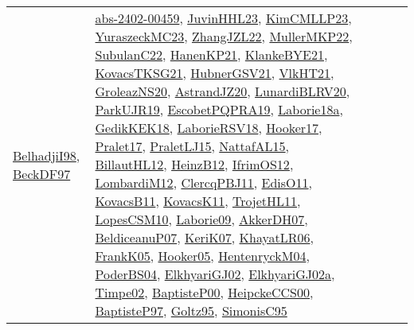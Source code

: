 {\begin{longtable}{lp{3cm}>{\raggedright}p{6cm}>{\raggedright}p{6cm}p{8cm}}
\href{articles/BelhadjiI98.pdf}{BelhadjiI98}\cite{BelhadjiI98}, \href{papers/BeckDF97.pdf}{BeckDF97}\cite{BeckDF97} & \href{articles/abs-2402-00459.pdf}{abs-2402-00459}\cite{abs-2402-00459}, \href{papers/JuvinHHL23.pdf}{JuvinHHL23}\cite{JuvinHHL23}, \href{papers/KimCMLLP23.pdf}{KimCMLLP23}\cite{KimCMLLP23}, \href{papers/YuraszeckMC23.pdf}{YuraszeckMC23}\cite{YuraszeckMC23}, \href{papers/ZhangJZL22.pdf}{ZhangJZL22}\cite{ZhangJZL22}, \href{articles/MullerMKP22.pdf}{MullerMKP22}\cite{MullerMKP22}, \href{articles/SubulanC22.pdf}{SubulanC22}\cite{SubulanC22}, \href{papers/HanenKP21.pdf}{HanenKP21}\cite{HanenKP21}, \href{papers/KlankeBYE21.pdf}{KlankeBYE21}\cite{KlankeBYE21}, \href{papers/KovacsTKSG21.pdf}{KovacsTKSG21}\cite{KovacsTKSG21}, \href{articles/HubnerGSV21.pdf}{HubnerGSV21}\cite{HubnerGSV21}, \href{articles/VlkHT21.pdf}{VlkHT21}\cite{VlkHT21}, \href{papers/GroleazNS20.pdf}{GroleazNS20}\cite{GroleazNS20}, \href{articles/AstrandJZ20.pdf}{AstrandJZ20}\cite{AstrandJZ20}, \href{articles/LunardiBLRV20.pdf}{LunardiBLRV20}\cite{LunardiBLRV20}, \href{papers/ParkUJR19.pdf}{ParkUJR19}\cite{ParkUJR19}, \href{articles/EscobetPQPRA19.pdf}{EscobetPQPRA19}\cite{EscobetPQPRA19}, \href{papers/Laborie18a.pdf}{Laborie18a}\cite{Laborie18a}, \href{articles/GedikKEK18.pdf}{GedikKEK18}\cite{GedikKEK18}, \href{articles/LaborieRSV18.pdf}{LaborieRSV18}\cite{LaborieRSV18}, \href{papers/Hooker17.pdf}{Hooker17}\cite{Hooker17}, \href{papers/Pralet17.pdf}{Pralet17}\cite{Pralet17}, \href{papers/PraletLJ15.pdf}{PraletLJ15}\cite{PraletLJ15}, \href{articles/NattafAL15.pdf}{NattafAL15}\cite{NattafAL15}, \href{papers/BillautHL12.pdf}{BillautHL12}\cite{BillautHL12}, \href{papers/HeinzB12.pdf}{HeinzB12}\cite{HeinzB12}, \href{papers/IfrimOS12.pdf}{IfrimOS12}\cite{IfrimOS12}, \href{articles/LombardiM12.pdf}{LombardiM12}\cite{LombardiM12}, \href{papers/ClercqPBJ11.pdf}{ClercqPBJ11}\cite{ClercqPBJ11}, \href{papers/EdisO11.pdf}{EdisO11}\cite{EdisO11}, \href{articles/KovacsB11.pdf}{KovacsB11}\cite{KovacsB11}, \href{articles/KovacsK11.pdf}{KovacsK11}\cite{KovacsK11}, \href{articles/TrojetHL11.pdf}{TrojetHL11}\cite{TrojetHL11}, \href{articles/LopesCSM10.pdf}{LopesCSM10}\cite{LopesCSM10}, \href{papers/Laborie09.pdf}{Laborie09}\cite{Laborie09}, \href{papers/AkkerDH07.pdf}{AkkerDH07}\cite{AkkerDH07}, \href{papers/BeldiceanuP07.pdf}{BeldiceanuP07}\cite{BeldiceanuP07}, \href{papers/KeriK07.pdf}{KeriK07}\cite{KeriK07}, \href{articles/KhayatLR06.pdf}{KhayatLR06}\cite{KhayatLR06}, \href{papers/FrankK05.pdf}{FrankK05}\cite{FrankK05}, \href{articles/Hooker05.pdf}{Hooker05}\cite{Hooker05}, \href{papers/HentenryckM04.pdf}{HentenryckM04}\cite{HentenryckM04}, \href{articles/PoderBS04.pdf}{PoderBS04}\cite{PoderBS04}, \href{papers/ElkhyariGJ02.pdf}{ElkhyariGJ02}\cite{ElkhyariGJ02}, \href{papers/ElkhyariGJ02a.pdf}{ElkhyariGJ02a}\cite{ElkhyariGJ02a}, \href{articles/Timpe02.pdf}{Timpe02}\cite{Timpe02}, \href{articles/BaptisteP00.pdf}{BaptisteP00}\cite{BaptisteP00}, \href{articles/HeipckeCCS00.pdf}{HeipckeCCS00}\cite{HeipckeCCS00}, \href{papers/BaptisteP97.pdf}{BaptisteP97}\cite{BaptisteP97}, \href{papers/Goltz95.pdf}{Goltz95}\cite{Goltz95}, \href{papers/SimonisC95.pdf}{SimonisC95}\cite{SimonisC95}\\

\end{longtable}}
